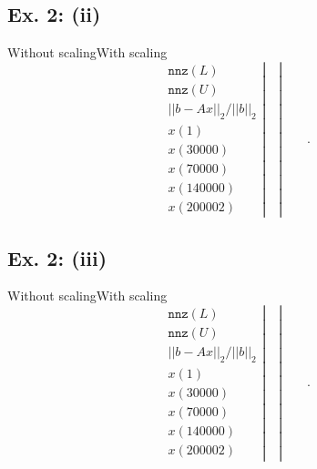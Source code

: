\documentclass[11pt]{article}
\theoremstyle{definition}
\theoremstyle{remark}
\newcommand{\newpart}{\vspace{-0.5\baselineskip}\hrulefill\vspace{-1.3\baselineskip}}
\theoremstyle{plain}
\begin{document}
\newpart
\subsection*{Ex. 2: (ii)}
\hspace{6cm}Without scaling\hspace{3.25cm}With scaling
\begin{equation*}
    \left.\begin{array}{c}
      \texttt{nnz}(L)\\
      \texttt{nnz}(U)\\
      ||b-Ax||_2/||b||_2\\
      x(1)\\
      x(30000)\\
      x(70000)\\
      x(140000)\\
      x(200002)
    \end{array}\right|\quad
    \left.\right|\qquad
    .
\end{equation*}

\newpart
\subsection*{Ex. 2: (iii)}
\hspace{6cm}Without scaling\hspace{3.25cm}With scaling
\begin{equation*}
    \left.\begin{array}{c}
      \texttt{nnz}(L)\\
      \texttt{nnz}(U)\\
      ||b-Ax||_2/||b||_2\\
      x(1)\\
      x(30000)\\
      x(70000)\\
      x(140000)\\
      x(200002)
    \end{array}\right|\quad
    \left.\right|\qquad
    .
\end{equation*}
\end{document}
